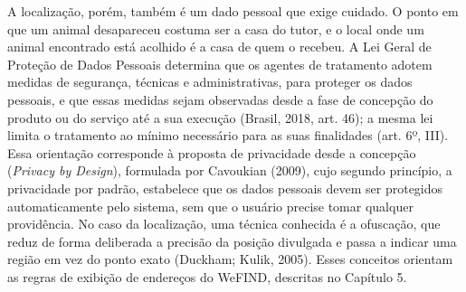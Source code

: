 A localização, porém, também é um dado pessoal que exige cuidado. O ponto em que um animal desapareceu costuma ser a casa do tutor, e o local onde um animal encontrado está acolhido é a casa de quem o recebeu. A Lei Geral de Proteção de Dados Pessoais determina que os agentes de tratamento adotem medidas de segurança, técnicas e administrativas, para proteger os dados pessoais, e que essas medidas sejam observadas desde a fase de concepção do produto ou do serviço até a sua execução (Brasil, 2018, art. 46); a mesma lei limita o tratamento ao mínimo necessário para as suas finalidades (art. 6º, III). Essa orientação corresponde à proposta de privacidade desde a concepção (\textit{Privacy by Design}), formulada por Cavoukian (2009), cujo segundo princípio, a privacidade por padrão, estabelece que os dados pessoais devem ser protegidos automaticamente pelo sistema, sem que o usuário precise tomar qualquer providência. No caso da localização, uma técnica conhecida é a ofuscação, que reduz de forma deliberada a precisão da posição divulgada e passa a indicar uma região em vez do ponto exato (Duckham; Kulik, 2005). Esses conceitos orientam as regras de exibição de endereços do WeFIND, descritas no Capítulo 5.
